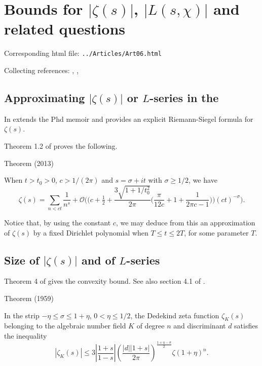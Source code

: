 \chapter{   Bounds for $|\zeta(s)|$, $|L(s,\chi)|$ and related questions}

Corresponding html file: \texttt{../Articles/Art06.html}









Collecting references:
\cite{Trudgian*11},
\cite{Kadiri-Ng*12},

 
 

\par 
\section{Approximating $|\zeta(s)|$ or $L$-series in the}



In
\cite{Reyna*11}
extends the
Phd memoir
\cite{Gabcke*79}
and provides an explicit Riemann-Siegel formula for $\zeta(s)$.

Theorem 1.2 of
\cite{Kadiri*13}
proves the following.
\par 
\begin{thm}{Theorem (2013)}

  When $t > t_0 > 0$, $c > 1/(2\pi)$ and $s = \sigma +it$ with
  $\sigma\ge 1/2$, we have
  $$
  \zeta(s)
  =\sum_{n < c t} \frac{1}{n^s}
	     + \mathcal{O} \biggl(
	     \biggl(c+\tfrac12+\frac{3\sqrt{1+1/t_0^2}}{2\pi}
	     \biggl(\frac{\pi}{12c}+1+\frac{1}{2\pi c-1}\biggr)
	     \biggr)
	     (ct)^{-\sigma}\biggr).
  $$
\end{thm}

Notice that, by using the constant $c$, we may deduce from this an
approximation of $\zeta(s)$ by a fixed Dirichlet polynomial when $T
\le t\le 2T$, for some parameter $T$.


\par 

\section{Size of $|\zeta(s)|$ and of $L$-series}



Theorem 4 of \cite{Rademacher*59} gives
the convexity bound. See also section 4.1 of \cite{Trudgian*13}.
\par 
\begin{thm}{Theorem (1959)}

In the strip $-\eta\le \sigma\le 1+\eta$, $0 < \eta\le 1/2$, the Dedekind zeta
function $\zeta_K(s)$ belonging to the algebraic number field $K$ of degree
$n$ and discriminant $d$ satisfies the inequality
$$
|\zeta_K(s)|\le 3 \left|\frac{1+s}{1-s}\right|
\left(\frac{|d||1+s|}{2\pi}\right)^{\frac{1+\eta-\sigma}{2}}
\zeta(1+\eta)^n.
$$
\end{thm}


